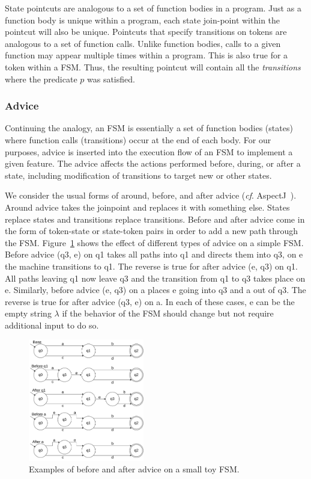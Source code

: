 \documentclass[conference]{IEEEtran}
\begin{document}
State pointcuts are analogous to a set of function bodies in a program. Just as a function body is unique within a program, each state join-point within the pointcut will also be unique.  Pointcuts that specify transitions on tokens are analogous to a set of function calls. Unlike function bodies, calls to a given function may appear multiple times within a program. This is also true for a token within a FSM. Thus, the resulting pointcut will contain all the \emph{transitions} where the predicate $p$ was satisfied. 

\subsubsection{Advice}
Continuing the analogy, an FSM is essentially a set of function bodies (states) where function calls (transitions) occur at the end of each body. For our purposes, advice is inserted into the execution flow of an FSM to implement a given feature. The advice affects the actions performed before, during, or after a state, including modification of transitions to target new or other states.

We consider the usual forms of around, before, and after advice (\emph{cf}. AspectJ~\cite{AspectJ:01}). Around advice takes the joinpoint and replaces it with something else. States replace states and transitions replace transitions. Before and after advice come in the form of token-state or state-token pairs in order to add a new path through the FSM. Figure~\ref{fig:adviceExamples} shows the effect of different types of advice on a simple FSM. Before advice (q3, e) on q1 takes all paths into q1 and directs them into q3, on e the machine transitions to q1. The reverse is true for after advice (e, q3) on q1. All paths leaving q1 now leave q3 and the transition from q1 to q3 takes place on e. Similarly, before advice (e, q3) on a places e going into q3 and a out of q3. The reverse is true for after advice (q3, e) on a.  In each of these cases, e can be the empty string $\lambda$ if the behavior of the FSM should change but not require additional input to do so.

\begin{figure}[ht]
    \centering
    \includegraphics[width=0.45\textwidth]{isca2023-latex-template/figures/AdviceExamples.drawio.pdf}
    \caption{Examples of before and after advice on a small toy FSM.}
    \label{fig:adviceExamples}
\end{figure}
\end{document}
